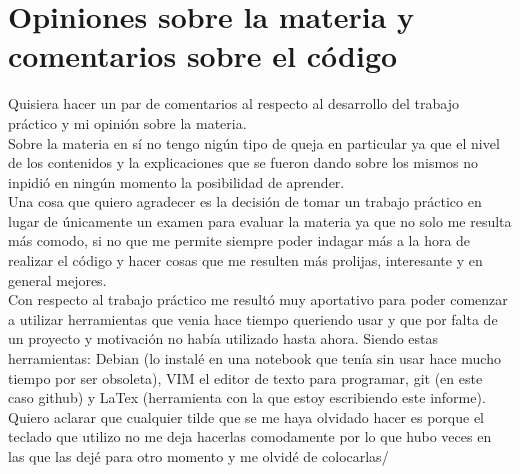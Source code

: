 \documentclass[oneside]{article}
\begin{document}
	\section*{Opiniones sobre la materia y comentarios sobre el código}
	Quisiera hacer un par de comentarios al respecto al desarrollo del trabajo práctico y mi opinión sobre la materia.\\
	Sobre la materia en sí no tengo nigún tipo de queja en particular  ya que el nivel de los contenidos y la explicaciones que se fueron dando sobre los mismos no inpidió en ningún momento la posibilidad de aprender.\\
	Una cosa que quiero agradecer es la decisión de tomar un trabajo práctico en lugar de únicamente un examen para evaluar la materia ya que no solo me resulta más 	comodo, si no que me permite siempre poder indagar más a la hora de realizar el código y hacer cosas que me resulten más prolijas, interesante y en general mejores.\\
	Con respecto al trabajo práctico me resultó muy aportativo para poder comenzar a utilizar herramientas que venia hace tiempo queriendo usar y que por falta de un proyecto y motivación no había utilizado hasta ahora. Siendo estas herramientas: Debian (lo instalé en una notebook que tenía sin usar hace mucho tiempo por ser obsoleta), VIM el editor de texto para programar, git (en este caso github) y LaTex (herramienta con la que estoy escribiendo este informe).\\
	Quiero aclarar que cualquier tilde que se me haya olvidado hacer es porque el teclado que utilizo no me deja hacerlas comodamente por lo que hubo veces en las que las dejé para otro momento y me olvidé de colocarlas/
	
	\newpage
	\thispagestyle{fancy}	
\end{document}
